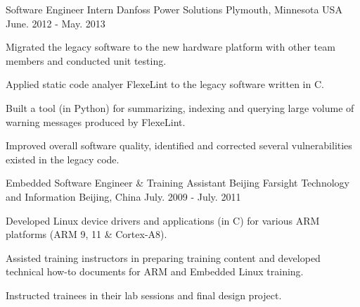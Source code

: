 

\begin{cventries}

  \cventry
    {Software Engineer Intern} %
    {Danfoss Power Solutions} %
    {Plymouth, Minnesota USA} %
    {June. 2012 - May. 2013} %
    {
      \begin{cvitems} %
        \item {Migrated the legacy software to the new hardware
    platform with other team members and conducted unit testing.}
       \item {Applied static code analyer FlexeLint to
    the legacy software written in C.}
       \item {Built a tool (in Python) for summarizing, indexing and
    querying large volume of warning messages produced by FlexeLint.}
       \item {Improved overall software quality, identified
    and corrected several vulnerabilities existed in the legacy code.}
      \end{cvitems}
    }

  \cventry
    {Embedded Software Engineer \& Training Assistant} %
    {Beijing Farsight Technology and Information} %
    {Beijing, China} %
    {July. 2009 - July. 2011} %
    {
      \begin{cvitems} %
        \item {Developed Linux device drivers and applications (in C) for various ARM
    platforms (ARM 9, 11 \& Cortex-A8).}
        \item {Assisted training instructors in preparing training
    content and developed technical how-to documents for ARM and
    Embedded Linux training.}
        \item {Instructed trainees in their lab sessions and final design project.}
      \end{cvitems}
    }


\end{cventries}

